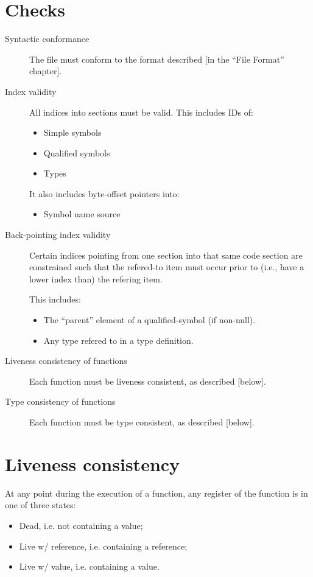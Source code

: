 \documentclass[a4paper]{report}
\begin{document}
\section{Checks}

\begin{description}
\item[Syntactic conformance]
  The file must conform to the format described [in the ``File Format'' chapter].
\item[Index validity]
  All indices into sections must be valid.
  This includes IDs of:
  \begin{itemize}
  \item Simple symbols
  \item Qualified symbols
  \item Types
  \end{itemize}

  It also includes byte-offset pointers into:
  \begin{itemize}
  \item Symbol name source
  \end{itemize}
\item[Back-pointing index validity]
  Certain indices pointing from one section into that same code
  section are constrained such that the refered-to item must occur
  prior to (i.e., have a lower index than) the refering item.

  This includes:
  \begin{itemize}
  \item The ``parent'' element of a qualified-symbol (if non-null).
  \item Any type refered to in a type definition.
  \end{itemize}
\item[Liveness consistency of functions]
  Each function must be liveness consistent, as described [below].
\item[Type consistency of functions]
  Each function must be type consistent, as described [below].
\end{description}

\section{Liveness consistency}
At any point during the execution of a function, any register of the
function is in one of three states:
\begin{itemize}
\item Dead, i.e. not containing a value;
\item Live w/ reference, i.e. containing a reference;
\item Live w/ value, i.e. containing a value.
\end{itemize}
\end{document}
